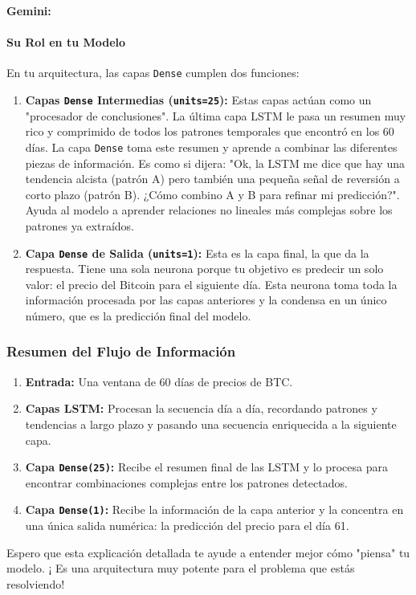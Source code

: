 \documentclass[12pt, a4paper]{article}
\newenvironment{gemini}{\par\noindent\textbf{Gemini:}\par\ignorespaces}{\par}
\begin{document}
\begin{gemini}
\paragraph{Su Rol en tu Modelo}
En tu arquitectura, las capas \texttt{Dense} cumplen dos funciones:
\begin{enumerate}
    \item \textbf{Capas \texttt{Dense} Intermedias (\texttt{units=25}):} Estas capas actúan como un "procesador de conclusiones". La última capa LSTM le pasa un resumen muy rico y comprimido de todos los patrones temporales que encontró en los 60 días. La capa \texttt{Dense} toma este resumen y aprende a combinar las diferentes piezas de información. Es como si dijera: "Ok, la LSTM me dice que hay una tendencia alcista (patrón A) pero también una pequeña señal de reversión a corto plazo (patrón B). ¿Cómo combino A y B para refinar mi predicción?". Ayuda al modelo a aprender relaciones no lineales más complejas sobre los patrones ya extraídos.
    \item \textbf{Capa \texttt{Dense} de Salida (\texttt{units=1}):} Esta es la capa final, la que da la respuesta. Tiene una sola neurona porque tu objetivo es predecir un solo valor: el precio del Bitcoin para el siguiente día. Esta neurona toma toda la información procesada por las capas anteriores y la condensa en un único número, que es la predicción final del modelo.
\end{enumerate}

\subsubsection{Resumen del Flujo de Información}
\begin{enumerate}
    \item \textbf{Entrada:} Una ventana de 60 días de precios de BTC.
    \item \textbf{Capas LSTM:} Procesan la secuencia día a día, recordando patrones y 
    tendencias a largo plazo y pasando una secuencia enriquecida a la siguiente capa.
    \item \textbf{Capa \texttt{Dense(25)}:} Recibe el resumen final de las LSTM y lo 
    procesa para encontrar combinaciones complejas entre los patrones detectados.
    \item \textbf{Capa \texttt{Dense(1)}:} Recibe la información de la capa anterior y la 
    concentra en una única salida numérica: la predicción del precio para el día 61.
\end{enumerate}
Espero que esta explicación detallada te ayude a entender mejor cómo "piensa" tu modelo. ¡
Es una arquitectura muy potente para el problema que estás resolviendo!
\end{gemini}
\end{document}
